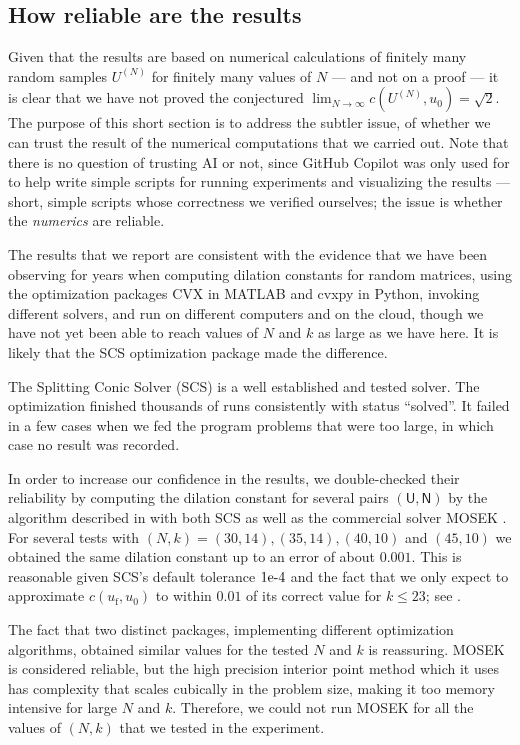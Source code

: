 \subsection{How reliable are the results}
Given that the results are based on numerical calculations of finitely many random samples $U^{(N)}$ for finitely many values of $N$ --- and not on a proof --- it is clear that we have not proved the conjectured $\lim_{N \to \infty} c(U^{(N)}, u_0) = \sqrt{2}$. 
The purpose of this short section is to address the subtler issue, of whether we can trust the result of the numerical computations that we carried out. 
Note that there is no question of trusting AI or not, since GitHub Copilot was only used for to help write simple scripts for running experiments and visualizing the results --- short, simple scripts whose correctness we verified ourselves; the issue is whether the {\em numerics} are reliable. 

The results that we report are consistent with the evidence that we have been observing for years when computing dilation constants for random matrices, using the optimization packages CVX in MATLAB and cvxpy in Python, invoking different solvers, and run on different computers and on the cloud, though we have not yet been able to reach values of $N$ and $k$ as large as we have here. 
It is likely that the SCS optimization package made the difference. 

The Splitting Conic Solver (SCS) \cite{ocpb:16,odonoghue:21} is a well established and tested solver. 
The optimization finished thousands of runs consistently with status ``solved''. It failed in a few cases when we fed the program problems that were too large, in which case no result was recorded. 

In order to increase our confidence in the results, we double-checked their reliability by computing the dilation constant for several pairs $(\mathsf{U},\mathsf{N})$ by the algorithm described in  with both SCS as well as the commercial solver MOSEK \cite{mosekjl}. 
For several tests with $(N,k) = (30,14), (35,14), (40,10)$ and $(45,10)$ we obtained the same dilation constant up to an error of about $0.001$. 
This is reasonable given SCS's default tolerance $1\textup{e-}4$ and the fact that we only expect to approximate $c(u_{\mathrm f}, u_0)$ to within $0.01$ of its correct value for $k\leq 23$; see . 

The fact that two distinct packages, implementing different optimization algorithms, obtained similar values for the tested $N$ and $k$ is reassuring. MOSEK is considered reliable, but the high precision interior point method which it uses has complexity that scales cubically in the problem size, making it too memory intensive for large $N$ and $k$. Therefore, we could not run MOSEK for all the values of $(N,k)$ that we tested in the experiment.


